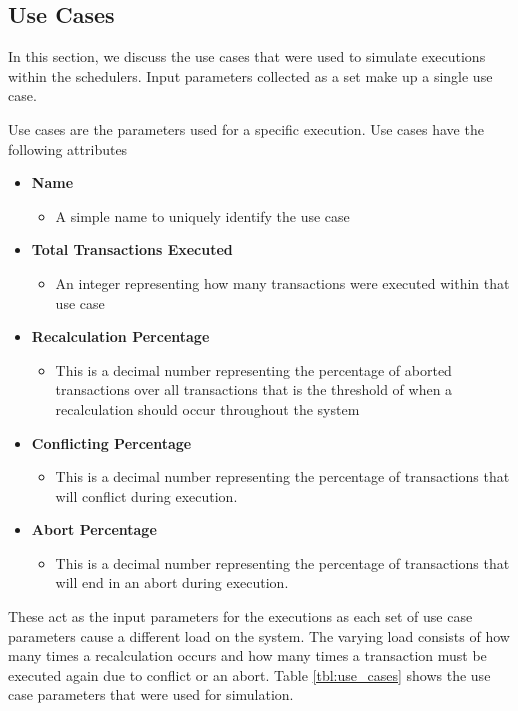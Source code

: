 \subsection{Use Cases}
\label{sec:er_use_cases}

In this section, we discuss the use cases that were used to simulate executions within the schedulers. Input parameters collected as a set make up a single use case.

Use cases are the parameters used for a specific execution. Use cases have the following attributes

\begin{itemize}
    \item \textbf{Name}
    \begin{itemize}
        \item A simple name to uniquely identify the use case
    \end{itemize}
    \item \textbf{Total Transactions Executed}
    \begin{itemize}
        \item An integer representing how many transactions were executed within that use case
    \end{itemize}
    \item \textbf{Recalculation Percentage}
    \begin{itemize}
        \item This is a decimal number representing the percentage of aborted transactions over all transactions that is the threshold of when a recalculation should occur throughout the system
    \end{itemize}
    \item \textbf{Conflicting Percentage}
    \begin{itemize}
        \item This is a decimal number representing the percentage of transactions that will conflict during execution.
    \end{itemize}
    \item \textbf{Abort Percentage}
    \begin{itemize}
        \item This is a decimal number representing the percentage of transactions that will end in an abort during execution.
    \end{itemize}
\end{itemize}


These act as the input parameters for the executions as each set of use case parameters cause a different load on the system. The varying load consists of how many times a recalculation occurs and how many times a transaction must be executed again due to conflict or an abort. Table \ref{tbl:use_cases} shows the use case parameters that were used for simulation.

